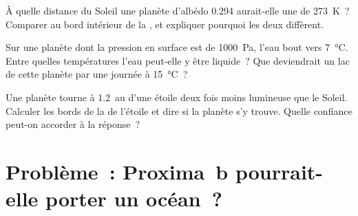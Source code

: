 \begin{exercise}[$\star\star\star$]\label{exo:g10:habitable-planet:13}
À quelle distance du Soleil une planète d'albédo 0.294 aurait-elle une
 de \qty{273}{K}~? Comparer au bord intérieur de la
, et expliquer pourquoi les deux diffèrent.
\end{exercise}

\begin{exercise}[$\star\star\star$]\label{exo:g10:habitable-planet:14}
Sur une planète dont la pression en surface est de \qty{1000}{Pa}, l'eau
bout vers \qty{7}{\degreeCelsius}. Entre quelles températures l'eau
peut-elle y être liquide~? Que deviendrait un lac de cette planète par une
journée à \qty{15}{\degreeCelsius}~?
\end{exercise}

\begin{exercise}[$\star\star\star$]\label{exo:g10:habitable-planet:15}
Une planète tourne à \qty{1.2}{au} d'une étoile deux fois moins lumineuse
que le Soleil. Calculer les bords de la  de l'étoile et dire
si la planète s'y trouve. Quelle confiance peut-on accorder à la réponse~?
\end{exercise}

\section{Problème~: Proxima~b pourrait-elle porter un océan~?}

